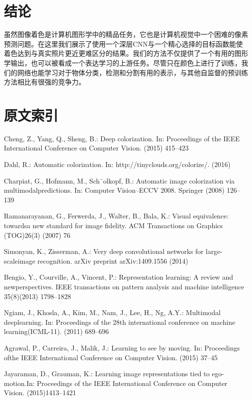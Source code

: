 \section{结论}

虽然图像着色是计算机图形学中的精品任务，它也是计算机视觉中一个困难的像素预测问题。在这里我们展示了使用一个深层CNN与一个精心选择的目标函数能使着色达到与真实照片更近更难区分的结果。我们的方法不仅提供了一个有用的图形学输出，也可以被看成一个表达学习的上游任务。尽管只在颜色上进行了训练，我们的网络也能学习对于物体分类，检测和分割有用的表示，与其他自监督的预训练方法相比有很强的竞争力。

\section*{原文索引}

\begin{translationbib}
\item Cheng, Z., Yang, Q., Sheng, B.: Deep colorization. In: Proceedings of the IEEE International Conference on Computer Vision. (2015) 415–423
\item Dahl, R.: Automatic colorization. In: http://tinyclouds.org/colorize/. (2016)
\item Charpiat, G., Hofmann, M., Sch¨olkopf, B.: Automatic image colorization via multimodalpredictions. In: Computer Vision–ECCV 2008. Springer (2008) 126–139
\item Ramanarayanan, G., Ferwerda, J., Walter, B., Bala, K.: Visual equivalence: towardsa new standard for image fidelity. ACM Transactions on Graphics (TOG)26(3) (2007) 76
\item Simonyan, K., Zisserman, A.: Very deep convolutional networks for large-scaleimage recognition. arXiv preprint arXiv:1409.1556 (2014)
\item Bengio, Y., Courville, A., Vincent, P.: Representation learning: A review and newperspectives. IEEE transactions on pattern analysis and machine intelligence 35(8)(2013) 1798–1828
\item Ngiam, J., Khosla, A., Kim, M., Nam, J., Lee, H., Ng, A.Y.: Multimodal deeplearning. In: Proceedings of the 28th international conference on machine learning(ICML-11). (2011) 689–696
\item Agrawal, P., Carreira, J., Malik, J.: Learning to see by moving. In: Proceedings ofthe IEEE International Conference on Computer Vision. (2015) 37–45
\item Jayaraman, D., Grauman, K.: Learning image representations tied to ego-motion.In: Proceedings of the IEEE International Conference on Computer Vision. (2015)1413–1421

\end{translationbib}
